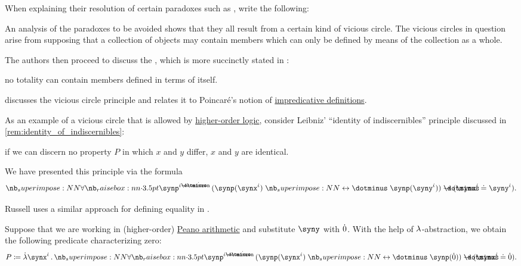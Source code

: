 \begin{remark}\label{rem:vicious_circle_principle}
  When explaining their resolution of certain paradoxes such as ,  write the following:
  \begin{displayquote}
    An analysis of the paradoxes to be avoided shows that they all result from a certain kind of vicious circle. The vicious circles in question arise from supposing that a collection of objects may contain members which can only be defined by means of the collection as a whole.
  \end{displayquote}

  The authors then proceed to discuss the , which is more succinctly stated in \cite[237]{Russell1908TypeTheory}:
  \begin{displayquote}
    no totality can contain members defined in terms of itself.
  \end{displayquote}

   discusses the vicious circle principle and relates it to Poincar\'{e}'s notion of \hyperref[con:impredicative_definition]{impredicative definitions}.

  As an example of a vicious circle that is allowed by \hyperref[def:higher_order_logic]{higher-order logic}, consider Leibniz' \enquote{identity of indiscernibles} principle discussed in \cref{rem:identity_of_indiscernibles}:
  \begin{displayquote}
    \textellipsis if we can discern no property \( P \) in which \( x \) and \( y \) differ, \( x \) and \( y \) are identical.
  \end{displayquote}

  We have presented this principle via the formula
  \begin{equation*}
    \qforall {\synp^{\syn\iota \synimplies \syn\omicron}} (\synp(\synx^{\syn\iota}) \syniff \synp(\syny^{\syn\iota})) \synimplies (\synx^{\syn\iota} \syneq \syny^{\syn\iota}).
  \end{equation*}

  Russell uses a similar approach for defining equality in \cite[246]{Russell1908TypeTheory}.

  Suppose that we are working in (higher-order) \hyperref[def:peano_arithmetic]{Peano arithmetic} and substitute \( \syny \) with \( \dot{0} \). With the help of \( {\mathrm \lambda} \)-abstraction, we obtain the following predicate characterizing zero:
  \begin{equation*}
    P \coloneqq \qabs {\synx^{\syn\iota}} \qforall {\synp^{\syn\iota \synimplies \syn\omicron}} (\synp(\synx^{\syn\iota}) \syniff \synp(\syn0)) \synimplies (\synx^{\syn\iota} \syneq \syn0).
  \end{equation*}


\end{remark}

